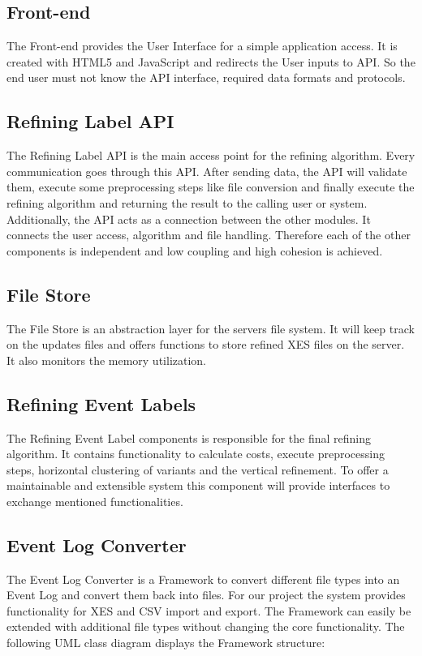 \documentclass[notitlepage]{article}
\begin{document}
\begin{flushleft}
\subsection{Front-end}
The Front-end provides the User Interface for a simple application access. It is created with HTML5 and JavaScript and redirects the User inputs to API.
So the end user must not know the API interface, required data formats and protocols.

\subsection{Refining Label API}
The Refining Label API is the main access point for the refining algorithm. Every communication goes through this API. After sending data, 
the API will validate them, execute some preprocessing steps like file conversion and finally execute the refining algorithm and returning the result to the calling user or system. 
Additionally, the API acts as a connection between the other modules. It connects the user access, algorithm and file handling.
Therefore each of the other components is independent and low coupling and high cohesion is achieved.
 
\subsection{File Store}
The File Store is an abstraction layer for the servers file system. It will keep track on the updates files and offers functions to store 
refined XES files on the server. It also monitors the memory utilization.
\subsection{Refining Event Labels}
The Refining Event Label components is responsible for the final refining algorithm. 
It contains functionality to calculate costs, execute preprocessing steps, horizontal clustering of variants and the vertical refinement.
To offer a maintainable and extensible system this component will provide interfaces to exchange mentioned functionalities. 


\subsection{Event Log Converter}
The Event Log Converter is a Framework to convert different file types into an Event Log and convert them back into files. 
For our project the system provides functionality for XES and CSV import and export. 
The Framework can easily be extended with additional file types without changing the core functionality.
\medskip
The following UML class diagram displays the Framework structure:


\end{flushleft}
\end{document}
